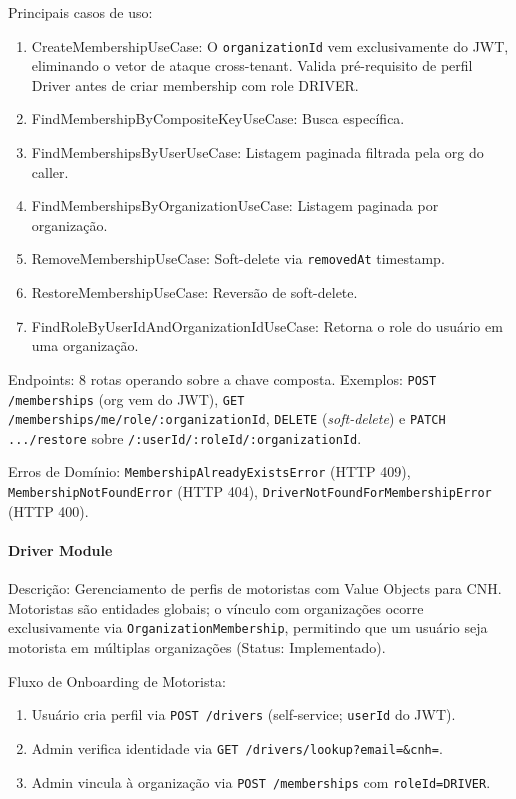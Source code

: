 Principais casos de uso:
\begin{enumerate}
\item CreateMembershipUseCase: O \texttt{organizationId} vem exclusivamente do JWT, eliminando o vetor de ataque cross-tenant. Valida pré-requisito de perfil Driver antes de criar membership com role DRIVER.
\item FindMembershipByCompositeKeyUseCase: Busca específica.
\item FindMembershipsByUserUseCase: Listagem paginada filtrada pela org do caller.
\item FindMembershipsByOrganizationUseCase: Listagem paginada por organização.
\item RemoveMembershipUseCase: Soft-delete via \texttt{removedAt} timestamp.
\item RestoreMembershipUseCase: Reversão de soft-delete.
\item FindRoleByUserIdAndOrganizationIdUseCase: Retorna o role do usuário em uma organização.
\end{enumerate}

Endpoints: 8 rotas operando sobre a chave composta. Exemplos: \texttt{POST /memberships} (org vem do JWT), \texttt{GET /memberships/me/role/:organizationId}, \texttt{DELETE} (\textit{soft-delete}) e \texttt{PATCH .../restore} sobre \texttt{/:userId/:roleId/:organizationId}.

Erros de Domínio: \texttt{MembershipAlreadyExistsError} (HTTP 409), \texttt{MembershipNotFoundError} (HTTP 404), \texttt{DriverNotFoundForMembershipError} (HTTP 400).

\paragraph{Driver Module}

Descrição: Gerenciamento de perfis de motoristas com Value Objects para CNH. Motoristas são entidades globais; o vínculo com organizações ocorre exclusivamente via \texttt{OrganizationMembership}, permitindo que um usuário seja motorista em múltiplas organizações (Status: Implementado).

Fluxo de Onboarding de Motorista:
\begin{enumerate}
\item Usuário cria perfil via \texttt{POST /drivers} (self-service; \texttt{userId} do JWT).
\item Admin verifica identidade via \texttt{GET /drivers/lookup?email=\&cnh=}.
\item Admin vincula à organização via \texttt{POST /memberships} com \texttt{roleId=DRIVER}.
\end{enumerate}

